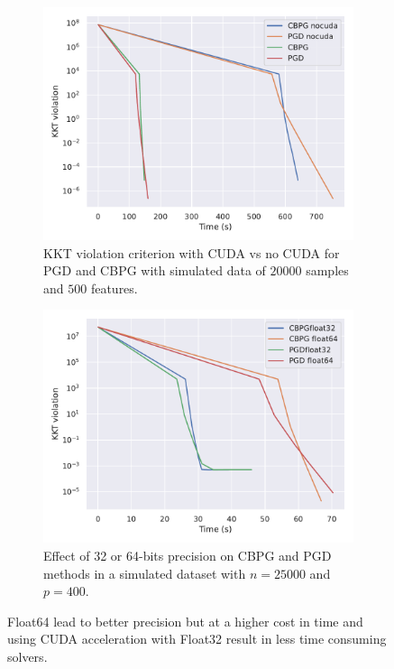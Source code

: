 \documentclass[a4]{article}
\begin{document}
\begin{figure}[!h]
	\begin{subfigure}{.45\textwidth}
		\centering
		\includegraphics[scale=.4]{./prebuilt_images/cuda_vs_nocuda_simulated_n20000p500.pdf}
		\caption{KKT violation criterion with CUDA vs no CUDA for PGD and CBPG with simulated data of $20000$ samples and $500$ features.}
		\label{fig:cuda_nocuda}
	\end{subfigure}
	\begin{subfigure}{.45\textwidth}
		\centering
		\includegraphics[scale=.4]{./prebuilt_images/float_comparison_n25000p400.pdf}
		\caption{Effect of 32 or 64-bits precision on CBPG and PGD methods in
		a simulated dataset with $n=25000$ and $p=400$.}
		\label{fig:float}
	\end{subfigure}
	\caption{Float64 lead to better precision but at a higher cost in time and using CUDA acceleration with Float32 result in less time consuming solvers.}
	\label{fig:floating_point}
\end{figure}
\end{document}
